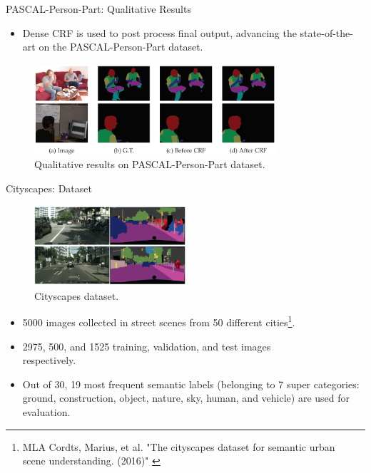 \documentclass{beamer}
\begin{document}
\begin{frame}{PASCAL-Person-Part: Qualitative Results}	
\begin{itemize}
	\item Dense CRF is used to post process final output, advancing the state-of-the-art on the PASCAL-Person-Part dataset.
\end{itemize}	
\begin{figure}
	\centering
	\includegraphics[width=0.80\textwidth]{figure/ss48.png}
	\captionsetup{justification=centering}
	\caption{Qualitative results on PASCAL-Person-Part dataset.}
	\label{fig:M4}
\end{figure}
\end{frame}

\begin{frame}{Cityscapes: Dataset}	
\begin{figure}
	\centering
	\includegraphics[width=0.50\textwidth]{figure/ss38.png}
	\captionsetup{justification=centering}
	\caption{Cityscapes dataset.}
\end{figure}
\vspace{-0.5cm}
\begin{itemize}
	\item {\color{blue}5000} images collected in street scenes from {\color{blue}50} different cities\footnote{MLA	
		Cordts, Marius, et al. "The cityscapes dataset for semantic urban\\ scene understanding. (2016)" \label{label3}}.
	\item {\color{blue}2975}, {\color{blue}500}, and {\color{blue}1525} training, validation, and test images\\ respectively.
	\item Out of {\color{blue}30}, {\color{blue}19} most frequent semantic labels (belonging to {\color{blue}7 super categories}: ground, construction, object, nature, sky, human, and vehicle) are used for evaluation.
\end{itemize}
\end{frame}
\end{document}
